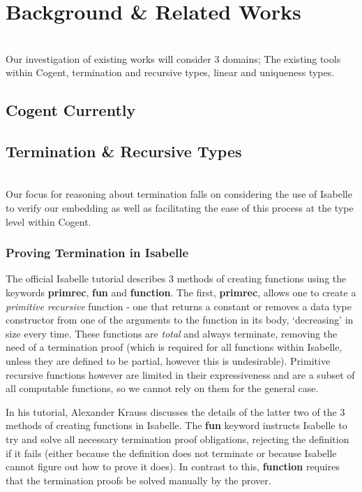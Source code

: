 \chapter{Background \& Related Works}\label{ch:background}
\\
Our investigation of existing works will consider 3 domains; The existing tools within Cogent,
termination and recursive types,  linear and uniqueness types.

\section{Cogent Currently}

\section{Termination \& Recursive Types}
\\
Our focus for reasoning about termination falls on considering the use of Isabelle to verify our 
embedding as well as facilitating the ease of this process at the type level within Cogent. 
\subsection{Proving Termination in Isabelle}

The official Isabelle tutorial\citep{IsabelleTutorial} describes 3 methods of creating functions using the keywords 
\textbf{primrec}, \textbf{fun} and \textbf{function}. The first, \textbf{primrec}, allows one to create a 
\textit{primitive recursive} function - one that returns a constant or removes a data type constructor from one
of the arguments to the function in its body, `decreasing' in size every time. These functions are \textit{total}
and always terminate, removing the need of a termination proof (which is required for all functions within Isabelle,
unless they are defined to be partial, however this is undesirable).
Primitive recursive functions however are limited in their expressiveness and are a subset of all computable
functions, so we cannot rely on them for the general case.

In his tutorial\citep{KraussIsabelle}, Alexander Krauss discusses the details of the latter two of the 3 methods
of creating functions in Isabelle. The \textbf{fun} keyword instructs Isabelle to try and solve all necessary
termination proof obligations, rejecting the definition if it fails (either because the definition does not 
terminate or because Isabelle cannot figure out how to prove it does). In contrast to this, \textbf{function}
requires that the termination proofs be solved manually by the prover.

